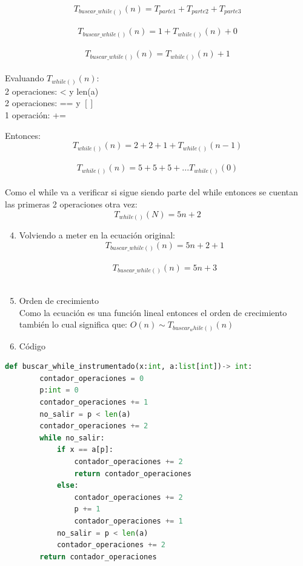 \documentclass[stu, 12pt, letterpaper, donotrepeattitle, floatsintext, natbib, helv]{apa7}
\begin{document}
\[T_{buscar\_while()}(n) = T_{parte1} + T_{parte2} + T_{parte3} \] \\ 
\[T_{buscar\_while()}(n) = 1 + T_{while()}(n) + 0\] \\
\[T_{buscar\_while()}(n) = T_{while()}(n) + 1\] \\
Evaluando $T_{while()}(n)$: \\
2 operaciones: < y len(a) \\
2 operaciones: == y $[]$ \\
1 operación: +=

Entonces: \[T_{while()}(n) = 2 + 2 + 1 + T_{while()}(n-1)\] \\
\[T_{while()}(n) = 5 + 5 + 5 + ... T_{while()}(0)\] \\
Como el while va a verificar si sigue siendo parte del while entonces se cuentan las primeras 2 operaciones otra vez:
\[T_{while()}(N) = 5n + 2\]

\begin{enumerate}
    \setcounter{enumi}{3}
    \item Volviendo a meter en la ecuación original:
\[T_{buscar\_while()}(n) = 5n + 2 + 1\] \\
\[T_{buscar\_while()}(n) = 5n + 3\] \\
    \item Orden de crecimiento \\
Como la ecuación es una función lineal entonces el orden de crecimiento también lo cual significa que: $O(n) \sim T_{buscar_while()}(n)$
    \item Código
\end{enumerate}
\begin{lstlisting}[language=Python]
    def buscar_while_instrumentado(x:int, a:list[int])-> int:
        contador_operaciones = 0
        p:int = 0
        contador_operaciones += 1
        no_salir = p < len(a)
        contador_operaciones += 2
        while no_salir:
            if x == a[p]:
                contador_operaciones += 2
                return contador_operaciones
            else:
                contador_operaciones += 2
                p += 1
                contador_operaciones += 1
            no_salir = p < len(a)
            contador_operaciones += 2
        return contador_operaciones
\end{lstlisting}

\end{document}
